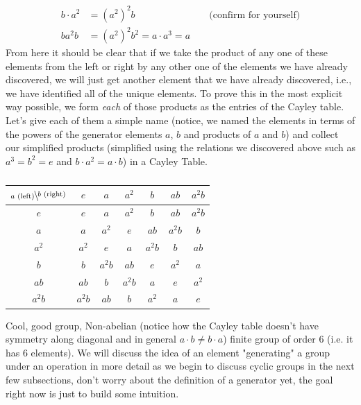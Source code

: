 \begin{example}
\begin{align}
b\cdot a^2&= (a^2)^2 b \ \ \ \ \ \ \ \ \ \ \ \ \ \ \ \ \ \ \ \ \ \ \ \ \ \ \ \ \ \ \ \ \ \text{ (confirm for yourself)} \nonumber \\
ba^2b&= (a^2)^2b^2=a\cdot a^3=a \nonumber
\end{align}
From here it should be clear that if we take the product of any one of these elements from the left or right by any other one of the elements we have already discovered, we will just get another element that we have already discovered, i.e., we have identified all of the unique elements. To prove this in the most explicit way possible, we form \textit{each} of those products as the entries of the Cayley table. Let's give each of them a simple name (notice, we named the elements in terms of the powers of the generator elements $a$, $b$ and products of $a$ and $b$) and collect our simplified products (simplified using the relations we discovered above such as $a^3=b^2=e$ and $b\cdot a^2=a\cdot b$) in a Cayley Table.
\begin{table}[ht!]
    \centering
    \begin{tabular}{c||c|c|c|c|c|c|}
         $\bsfrac{b\text{ (right)}}{a\text{ (left)}}$& $e$&$a$&$a^2$&$b$&$ab$&$a^2b$  \\ \hline \hline
         $e$&$e$&$a$&$a^2$&$b$&$ab$&$a^2b$  \\ \hline
         $a$&$a$&$a^2$&$e$&$ab$&$a^2b$& $b$\\ \hline
         $a^2$&$a^2$&$e$&$a$&$a^2b$ &$b$ &$ab$  \\ \hline
         $b$&$b$& $a^2b$&$ab$ &$e$ &$a^2$ &$a$ \\ \hline
         $ab$ & $ab$ &$b$ &$a^2b$ &$a$ &$e$ &$a^2$   \\ \hline
         $a^2b$ & $a^2b$ & $ab$ &$b$ &$a^2$ &$a$ &$e$   \\ \hline
    \end{tabular}
    \caption{}
    \label{tab:Cayley_from_generators}
\end{table}

Cool, good group, Non-abelian (notice how the Cayley table doesn't have symmetry along diagonal and in general $a\cdot b \neq b\cdot a$) finite group of order 6 (i.e. it has 6 elements). We will discuss the idea of an element "generating" a group under an operation in more detail as we begin to discuss cyclic groups in the next few subsections, don't worry about the definition of a generator yet, the goal right now is just to build some intuition.
\end{example}
\newpage
